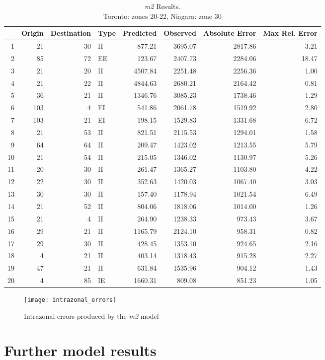 \begin{table}[ht]
\caption{\textit{m2} Results. \\Toronto: zones 20-22, Niagara: zone 30}
\label{table:m2-error-table}
\centering
\begin{tabular}{rrrlrrrr}
  \toprule
 & Origin & Destination & Type & Predicted & Observed & Absolute Error & Max Rel. Error \\ 
  \midrule
1 & 21 & 30 & II & 877.21 & 3695.07 & 2817.86 & 3.21 \\ 
  2 & 85 & 72 & EE & 123.67 & 2407.73 & 2284.06 & 18.47 \\ 
  3 & 21 & 20 & II & 4507.84 & 2251.48 & 2256.36 & 1.00 \\ 
  4 & 21 & 22 & II & 4844.63 & 2680.21 & 2164.42 & 0.81 \\ 
  5 & 36 & 21 & II & 1346.76 & 3085.23 & 1738.46 & 1.29 \\ 
  6 & 103 & 4 & EI & 541.86 & 2061.78 & 1519.92 & 2.80 \\ 
  7 & 103 & 21 & EI & 198.15 & 1529.83 & 1331.68 & 6.72 \\ 
  8 & 21 & 53 & II & 821.51 & 2115.53 & 1294.01 & 1.58 \\ 
  9 & 64 & 64 & II & 209.47 & 1423.02 & 1213.55 & 5.79 \\ 
  10 & 21 & 54 & II & 215.05 & 1346.02 & 1130.97 & 5.26 \\ 
  11 & 20 & 30 & II & 261.47 & 1365.27 & 1103.80 & 4.22 \\ 
  12 & 22 & 30 & II & 352.63 & 1420.03 & 1067.40 & 3.03 \\ 
  13 & 30 & 30 & II & 157.40 & 1178.94 & 1021.54 & 6.49 \\ 
  14 & 21 & 52 & II & 804.06 & 1818.06 & 1014.00 & 1.26 \\ 
  15 & 21 & 4 & II & 264.90 & 1238.33 & 973.43 & 3.67 \\ 
  16 & 29 & 21 & II & 1165.79 & 2124.10 & 958.31 & 0.82 \\ 
  17 & 29 & 30 & II & 428.45 & 1353.10 & 924.65 & 2.16 \\ 
  18 & 4 & 21 & II & 403.14 & 1318.43 & 915.28 & 2.27 \\ 
  19 & 47 & 21 & II & 631.84 & 1535.96 & 904.12 & 1.43 \\ 
  20 & 4 & 85 & IE & 1660.31 & 809.08 & 851.23 & 1.05 \\ 
   \bottomrule
\end{tabular}
\end{table}

\begin{figure}[H]
\centering
\texttt{[image: intrazonal\_errors]}
\caption{Intrazonal errors produced by the \textit{m2} model}
\label{fig:m2-intrazonal}
\end{figure}

\chapter{Further model results}



